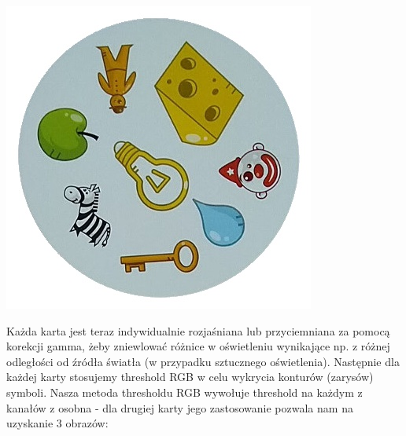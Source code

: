 \documentclass[10pt,a4paper]{article}
\begin{document}
\begin{center}
\includegraphics[scale=0.25]{2.1/card5.jpg}
\end{center}
Każda karta jest teraz indywidualnie rozjaśniana lub przyciemniana za pomocą korekcji gamma, żeby zniewlować różnice w oświetleniu wynikające np. z różnej odległości od źródła światła (w przypadku sztucznego oświetlenia).
Następnie dla każdej karty stosujemy threshold RGB w celu wykrycia konturów (zarysów) symboli. Nasza metoda thresholdu RGB wywołuje threshold na każdym z kanałów z osobna - dla drugiej karty jego zastosowanie pozwala nam na uzyskanie 3 obrazów:
\end{document}
